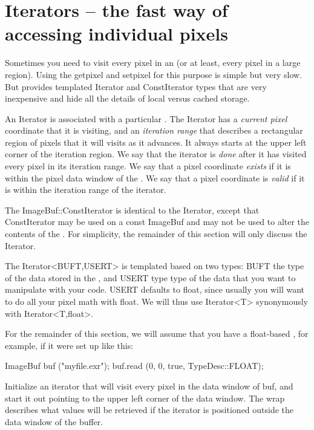 \section{Iterators -- the fast way of accessing individual pixels}

Sometimes you need to visit every pixel in an \ImageBuf (or at least,
every pixel in a large region).  Using the {\cf getpixel} and {\cf
  setpixel} for this purpose is simple but very slow.  But \ImageBuf
provides templated {\cf Iterator} and {\cf ConstIterator} types
that are very inexpensive and hide all the details of local versus
cached storage.

An {\cf Iterator} is associated with a particular \ImageBuf.  
The {\cf Iterator} has a \emph{current pixel} coordinate that it is
visiting, and an \emph{iteration range} that describes a rectangular
region of pixels that it will visits as it advances.  It always starts
at the upper left corner of the iteration region.  We say that
the iterator is \emph{done} after it has visited every pixel in its
iteration range.  We say that a pixel coordinate \emph{exists} if it is
within the pixel data window of the \ImageBuf.  We say that a pixel
coordinate is \emph{valid} if it is within the iteration range of the
iterator.

The {\cf ImageBuf::ConstIterator} is identical to the {\cf Iterator},
except that {\cf ConstIterator} may be used on a {\cf const ImageBuf}
and may not be used to alter the contents of the \ImageBuf.  For 
simplicity, the remainder of this section will only discuss the 
{\cf Iterator}.

The {\cf Iterator<BUFT,USERT>} is templated based on two types: {\cf
  BUFT} the type of the data stored in the \ImageBuf, and {\cf USERT}
type type of the data that you want to manipulate with your code.  {\cf
  USERT} defaults to {\cf float}, since usually you will want to do all
your pixel math with {\cf float}.  We will thus use {\cf Iterator<T>}
synonymously with {\cf Iterator<T,float>}.

For the remainder of this section, we will assume that you have a
{\cf float}-based \ImageBuf, for example, if it were set up like this:

\begin{code}
ImageBuf buf ("myfile.exr");
buf.read (0, 0, true, TypeDesc::FLOAT);
\end{code}


Initialize an iterator that will visit every pixel in the data window
of {\cf buf}, and start it out pointing to the upper left corner of
the data window.  The {\cf wrap} describes what values will be retrieved
if the iterator is positioned outside the data window of the buffer.
\apiend

